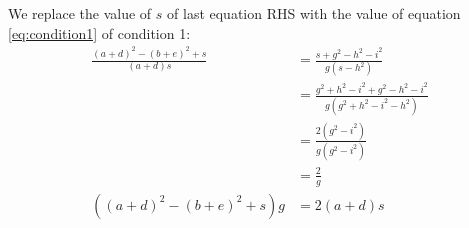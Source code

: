 \documentclass[11pt]{article}
\begin{document}
We replace the value of $s$ of last equation RHS with the value of equation \ref{eq:condition1}
of condition 1:
\begin{align}
\frac{(a+d)^2 - (b+e)^2 + s}{(a+d)s} &= \frac{s + g^2 - h^2 - i^2}{g(s-h^2)} \nonumber\\
 &= \frac{g^2 + h^2 - i^2 + g^2 - h^2 - i^2}{g(g^2 + h^2 - i^2-h^2)} \nonumber\\
 &= \frac{2(g^2 - i^2)}{g(g^2 - i^2)} \nonumber\\
 &= \frac{2}{g} \nonumber\\
((a+d)^2 - (b+e)^2 + s)g &= 2(a+d)s \label{eq:condition2}
\end{align}
\end{document}
